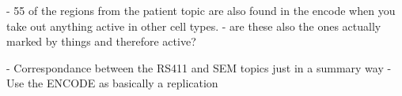 
- 55 of the regions from the patient topic are also found in the encode when you take out anything active in other cell types.
- are these also the ones actually marked by things and therefore active? 

- Correspondance between the RS411 and SEM topics just in a summary way
- Use the ENCODE as basically a replication

